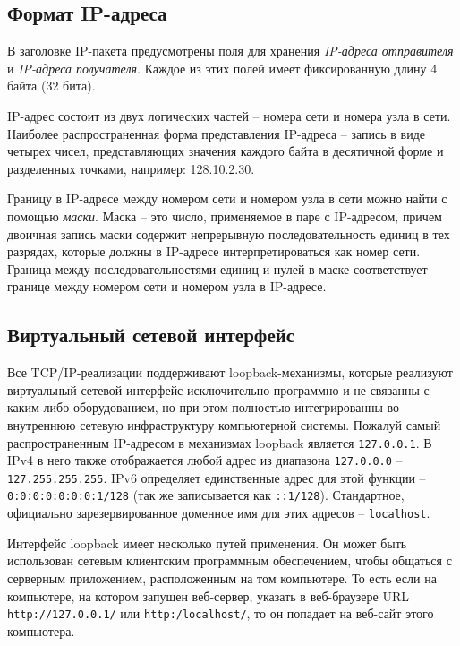 \documentclass[%
	11pt,
	a4paper,
	utf8,
		]{article}
\begin{document}
\subsection{Формат IP-адреса}

В заголовке IP-пакета предусмотрены поля для хранения \emph{IP-адреса отправителя} и \emph{IP-адреса получателя}. Каждое из этих полей имеет фиксированную длину 4 байта (32 бита).

IP-адрес состоит из двух логических частей -- номера сети и номера узла в сети. Наиболее распространенная форма представления IP-адреса -- запись в виде четырех чисел, представляющих значения каждого байта в десятичной форме и разделенных точками, например: 128.10.2.30.

Границу в IP-адресе между номером сети и номером узла в сети можно найти с помощью \emph{маски}. Маска -- это число, применяемое в паре с IP-адресом, причем двоичная запись маски содержит непрерывную последовательность единиц в тех разрядах, которые должны в IP-адресе интерпретироваться как номер сети. Граница между последовательностями единиц и нулей в маске соответствует границе между номером сети и номером узла в IP-адресе.

\subsection{Виртуальный сетевой интерфейс}

Все TCP/IP-реализации поддерживают loopback-механизмы, которые реализуют виртуальный сетевой интерфейс исключительно программно и не связанны с каким-либо оборудованием, но при этом полностью интегрированны во внутреннюю сетевую инфраструктуру компьютерной системы. Пожалуй самый распространенным IP-адресом в механизмах loopback является \texttt{127.0.0.1}. В IPv4 в него также отображается любой адрес из диапазона \texttt{127.0.0.0} -- \texttt{127.255.255.255}. IPv6 определяет единственные адрес для этой функции -- \texttt{0:0:0:0:0:0:0:1/128} (так же записывается как \texttt{::1/128}). Стандартное, официально зарезервированное доменное имя для этих адресов -- \texttt{localhost}.

Интерфейс loopback имеет несколько путей применения. Он может быть использован сетевым клиентским программным обеспечением, чтобы общаться с серверным приложением, расположенным на том компьютере. То есть если на компьютере, на котором запущен веб-сервер, указать в веб-браузере URL \texttt{http://127.0.0.1/} или \texttt{http:/localhost/}, то он попадает на веб-сайт этого компьютера.
\end{document}
